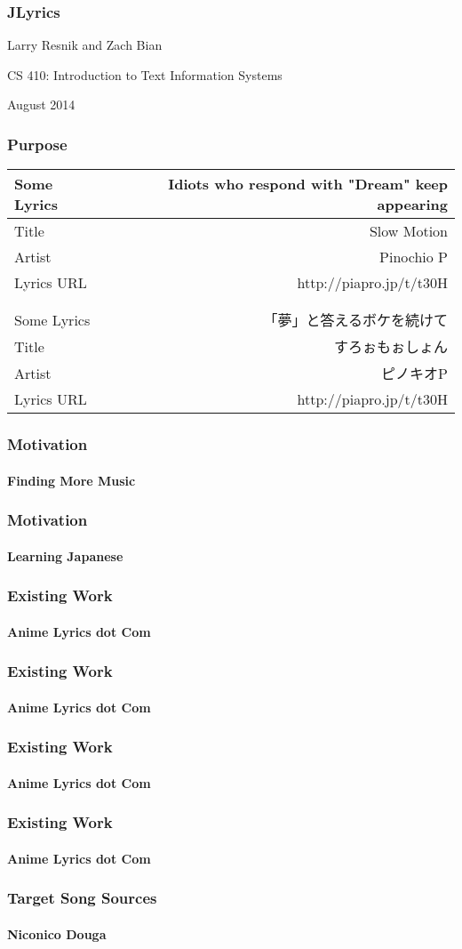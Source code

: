 \documentclass{beamer}
\begin{document}
\begin{CJK}{UTF8}{zhsong}
\begin{frame}
\frametitle{JLyrics}
Larry Resnik and Zach Bian

CS 410: Introduction to Text Information Systems

August 2014
\end{frame}
\begin{frame}
\frametitle{Purpose}

\begin{center}
\begin{tabular}{l r}
Some Lyrics & Idiots who respond with "Dream" keep appearing \\
\hline
Title & Slow Motion \\
Artist & Pinochio P \\
Lyrics URL & http://piapro.jp/t/t30H \\
&\\
&\\
Some Lyrics & 「夢」と答えるボケを続けて \\
\hline
Title & すろぉもぉしょん \\
Artist & ピノキオP \\
Lyrics URL & http://piapro.jp/t/t30H \\
\end{tabular}
\end{center}
\end{frame}
\begin{frame}
\frametitle{Motivation}
\framesubtitle{Finding More Music}
\end{frame}
\begin{frame}
\frametitle{Motivation}
\framesubtitle{Learning Japanese}
\end{frame}
\begin{frame}
\frametitle{Existing Work}
\framesubtitle{Anime Lyrics dot Com}
\end{frame}
\begin{frame}
\frametitle{Existing Work}
\framesubtitle{Anime Lyrics dot Com}
\end{frame}
\begin{frame}
\frametitle{Existing Work}
\framesubtitle{Anime Lyrics dot Com}
\end{frame}
\begin{frame}
\frametitle{Existing Work}
\framesubtitle{Anime Lyrics dot Com}
\end{frame}
\begin{frame}
\frametitle{Target Song Sources}
\framesubtitle{Niconico Douga}


\end{frame}
\end{CJK}
\end{document}
